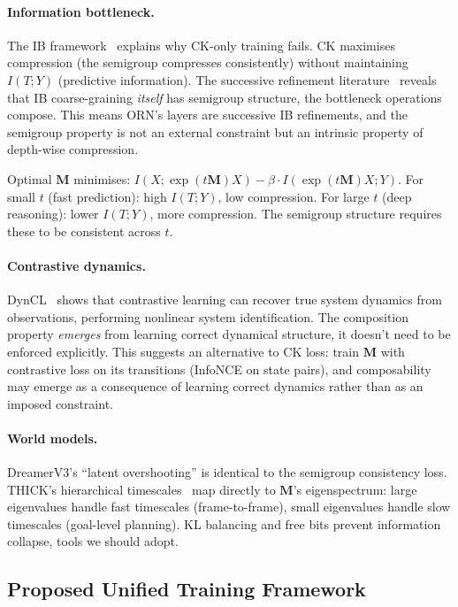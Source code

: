 \documentclass[11pt, a4paper]{article}
\newcommand{\M}{\mathbf{M}}
\theoremstyle{plain}
\theoremstyle{remark}
\begin{document}
\paragraph{Information bottleneck.}
The IB framework~\cite{tishby1999} explains why CK-only training fails.
CK maximises compression (the semigroup compresses consistently) without maintaining $I(T; Y)$ (predictive information).
The successive refinement literature~\cite{ib_refinement} reveals that IB coarse-graining \emph{itself} has semigroup structure, the bottleneck operations compose.
This means ORN's layers are successive IB refinements, and the semigroup property is not an external constraint but an intrinsic property of depth-wise compression.

Optimal $\M$ minimises: $I(X; \exp(t\M)X) - \beta \cdot I(\exp(t\M)X; Y)$.
For small $t$ (fast prediction): high $I(T; Y)$, low compression.
For large $t$ (deep reasoning): lower $I(T; Y)$, more compression.
The semigroup structure requires these to be consistent across $t$.

\paragraph{Contrastive dynamics.}
DynCL~\cite{dyncl2025} shows that contrastive learning can recover true system dynamics from observations, performing nonlinear system identification.
The composition property \emph{emerges} from learning correct dynamical structure, it doesn't need to be enforced explicitly.
This suggests an alternative to CK loss: train $\M$ with contrastive loss on its transitions (InfoNCE on state pairs), and composability may emerge as a consequence of learning correct dynamics rather than as an imposed constraint.

\paragraph{World models.}
DreamerV3's ``latent overshooting'' is identical to the semigroup consistency loss.
THICK's hierarchical timescales~\cite{thick2024} map directly to $\M$'s eigenspectrum: large eigenvalues handle fast timescales (frame-to-frame), small eigenvalues handle slow timescales (goal-level planning).
KL balancing and free bits prevent information collapse, tools we should adopt.

\subsection{Proposed Unified Training Framework}
\end{document}
